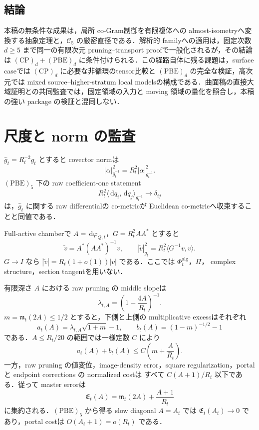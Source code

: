 \documentclass[a4paper,11pt]{ltjsarticle}
\numberwithin{equation}{section}
\theoremstyle{plain}
\theoremstyle{definition}
\theoremstyle{remark}
\newcommand{\cC}{\mathcal C}
\newcommand{\dd}{\,\mathrm d}
\begin{document}
\subsection{結論}
本稿の無条件な成果は，局所 co-Gram制御を有限複体への almost-isometryへ変換する抽象定理と，$\cC_5$ の厳密直径である．解析的 familyへの適用は，固定次数 $d\ge5$ まで同一の有限次元 pruning--transport proofで一般化されるが，その結論は $\mathrm{(CP)}_d+\mathrm{(PBE)}_d$ に条件付けられる．この経路自体に残る課題は，surface caseでは $\mathrm{(CP)}_d$ に必要な非循環のtensor比較と $\mathrm{(PBE)}_d$ の完全な検証，高次元では mixed source--higher-stratum local modelsの構成である．曲面稿の直接大域証明との共同監査では，固定領域の入力と moving 領域の量化を照合し，本稿の強い package の検証と混同しない．

\appendix


\section{尺度と norm の監査}\label{app:normalization}

$\widehat g_t=R_t^{-2}g_t$ とすると covector normは
\[
 |\alpha|_{\widehat g_t^{-1}}^2=R_t^2|\alpha|_{g_t^{-1}}^2.
\]
$\mathrm{(PBE)}_5$ 下の raw coefficient-one statement
\[
 R_t^2\langle\dd q_i,\dd q_j\rangle_{g_t^{-1}}\to\delta_{ij}
\]
は，$\widehat g_t$ に関する raw differentialの co-metricが Euclidean co-metricへ収束することと同値である．

Full-active chamberで $A=\dd\varphi_{Q,t}$，$G=R_t^2AA^*$ とすると
\[
 \widetilde v=A^*(AA^*)^{-1}v,
 \qquad
 |\widetilde v|_{g_t}^2=R_t^2\langle G^{-1}v,v\rangle.
\]
$G\to I$ なら $|\widetilde v|=R_t(1+o(1))|v|$ である．ここでは $\Phi_t^{\mathrm{alg}}$，$\Pi$，
complex structure，section tangentを用いない．

有限深さ $A$ における raw pruning の middle slopeは
\[
 \lambda_{t,A}=\left(1-\frac{4A}{R_t}\right)^{-1}.
\]
$m=\mathfrak m_t(2A)\le1/2$ とすると，下側と上側の multiplicative excessはそれぞれ
\[
 a_t(A)=\lambda_{t,A}\sqrt{1+m}-1,
 \qquad
 b_t(A)=(1-m)^{-1/2}-1
\]
である．$A\le R_t/20$ の範囲では一様定数 $C$ により
\[
 a_t(A)+b_t(A)
 \le C\left(m+\frac{A}{R_t}\right).
\]
一方，raw pruning の値変位，image-density error，square regularization，portal と endpoint corrections の normalized costは
すべて $C(A+1)/R_t$ 以下である．従って master errorは
\[
 \mathfrak E_t(A)=\mathfrak m_t(2A)+\frac{A+1}{R_t}
\]
に集約される．$\mathrm{(PBE)}_5$ から得る slow diagonal $A=A_t$ では $\mathfrak E_t(A_t)\to0$ であり，portal costは
$O(A_t+1)=o(R_t)$ である．
\end{document}
